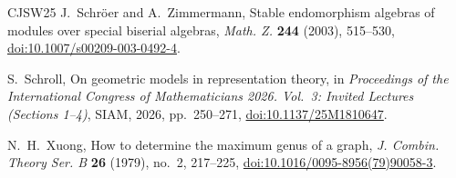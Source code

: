\documentclass[11pt]{amsart}
\theoremstyle{definition}
\theoremstyle{plain}
\theoremstyle{definition}
\theoremstyle{definition}
\begin{document}
\begin{thebibliography}{CJSW25}
J.~Schr\"oer and A.~Zimmermann,
\newblock Stable endomorphism algebras of modules over special biserial
algebras,
\newblock \emph{Math. Z.} \textbf{244} (2003), 515--530,
\newblock \href{https://doi.org/10.1007/s00209-003-0492-4}
{doi:10.1007/s00209-003-0492-4}.

S.~Schroll,
\newblock On geometric models in representation theory,
\newblock in \emph{Proceedings of the International Congress of
Mathematicians 2026. Vol.~3: Invited Lectures (Sections 1--4)},
SIAM, 2026, pp.~250--271,
\newblock \href{https://doi.org/10.1137/25M1810647}
{doi:10.1137/25M1810647}.

N.~H.~Xuong,
\newblock How to determine the maximum genus of a graph,
\newblock \emph{J. Combin. Theory Ser. B} \textbf{26} (1979), no.~2,
217--225,
\newblock \href{https://doi.org/10.1016/0095-8956(79)90058-3}
{doi:10.1016/0095-8956(79)90058-3}.

\end{thebibliography}
\end{document}
